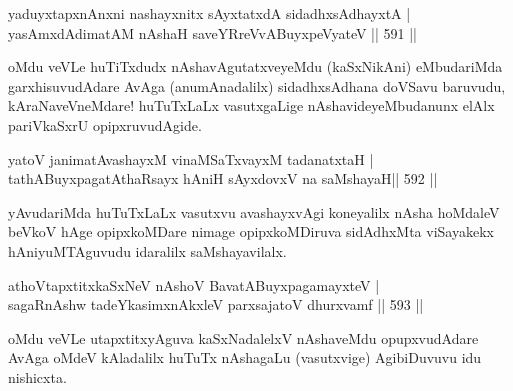 
\begin{shl}
yaduyxtapxnAnxni nashayxnitx sAyxtatxdA sidadhxsAdhayxtA | \\
yasAmxdAdimatAM nAshaH saveYRreVvABuyxpeVyateV \hfill||  591 ||  
\end{shl}

\begin{artha}
oMdu veVLe huTiTxdudx nAshavAgutatxveyeMdu (kaSxNikAni) eMbudariMda garxhisuvudAdare AvAga (anumAnadalilx) sidadhxsAdhana doVSavu baruvudu, kAraNaveVneMdare! huTuTxLaLx vasutxgaLige nAshavideyeMbudanunx elAlx pariVkaSxrU opipxruvudAgide.
\end{artha}


\begin{shl}
\footnotemark[1]yatoV janimatA\s vashayxM vinaMSaTxvayxM tadanatxtaH | \\
tathA\s \footnotemark[2]BuyxpagatAthaRsayx hAniH sAyxdovxV na saMshayaH\hfill ||  592 ||  
\end{shl}

\begin{artha}
yAvudariMda huTuTxLaLx vasutxvu avashayxvAgi koneyalilx nAsha hoMdaleV beVkoV hAge opipxkoMDare nimage opipxkoMDiruva sidAdhxMta viSayakekx hAniyuMTAguvudu idaralilx saMshayavilalx.
\end{artha}

\begin{shl}
athoVtapxtitxkaSxNeV nAshoV BavatA\s BuyxpagamayxteV | \\
sagaRnAshw tadeYkasimxnAkxleV parxsajatoV dhurxvamf \hfill||  593 ||  
\end{shl}

\begin{artha}
oMdu veVLe utapxtitxyAguva kaSxNadalelxV nAshaveMdu opupxvudAdare AvAga oMdeV kAladalilx huTuTx nAshagaLu (vasutxvige) AgibiDuvuvu idu nishicxta.
\end{artha}

